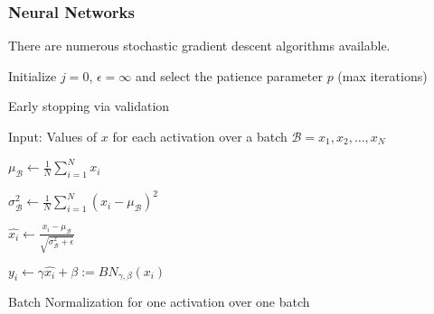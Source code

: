 \documentclass[man, a4paper, biblatex]{apa6}
\begin{document}
\subsubsection{Neural Networks}

There are numerous stochastic gradient descent algorithms available.

\begin{algorithm}
	\SetAlgoLined
	Initialize $j = 0$, $\epsilon = \infty$ and select the patience parameter $p$ (max iterations)\
	
	\caption{Early stopping via validation}
\end{algorithm}

\begin{algorithm}
	Input: Values of $x$ for each activation over a batch $\mathcal{B} = {x_1, x_2, \dots, x_N}$
	
	$\mu_\mathcal{B} \leftarrow \frac{1}{N} \sum_{i = 1}^{N}x_i$
	
	$\sigma_\mathcal{B}^2 \leftarrow \frac{1}{N} \sum_{i = 1}^{N}(x_i - \mu_\mathcal{B})^2$
	
	$\hat{x_i} \leftarrow \frac{x_i - \mu_\mathcal{B}}{\sqrt{\sigma_\mathcal{B}^2 + \epsilon}}$
	
	$y_i \leftarrow \gamma\hat{x_i} + \beta := BN_{\gamma, \beta}(x_i)$
	
	\caption{Batch Normalization for one activation over one batch}
\end{algorithm}
\end{document}
